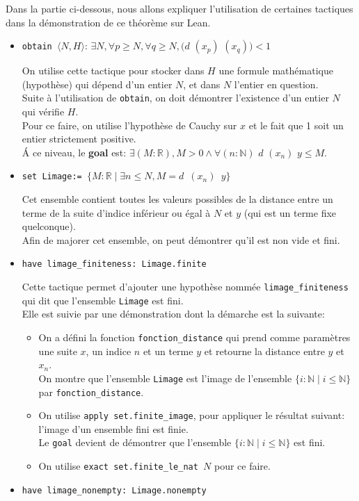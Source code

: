 Dans la partie ci-dessous, nous allons expliquer l'utilisation de certaines tactiques dans la démonstration de ce théorème sur Lean.\\
\begin{itemize}
    \item \texttt{obtain $\langle N, H \rangle $}: $\exists N, \forall p \geq N, \forall q \geq N, (d$ $(x_p)$ $(x_q)) < 1$
    
    On utilise cette tactique pour stocker dans $H$ une formule mathématique (hypothèse) qui dépend d'un entier $N$, et dans $N$ l'entier en question. \\ Suite à l'utilisation de \texttt{obtain}, on doit démontrer l'existence d'un entier $N$ qui vérifie $H$.\\ Pour ce faire, on utilise l'hypothèse de Cauchy sur $x$ et le fait que 1 soit un entier strictement positive.\\
    \'A ce niveau, le \textbf{goal} est: $\exists (M:\mathbb{R}), M > 0 \wedge \forall (n : \mathbb{N})$ $d$ $(x_n)$ $y \leq M$.
    \item \texttt{set Limage:= $\big\{ M: \mathbb{R} \mid \exists n\leq N, M = d$ $(x_n)$ $y\big\}$}
    
    
    Cet ensemble contient toutes les valeurs possibles de la distance entre un terme de la suite d'indice inférieur ou égal à $N$ et $y$ (qui est un terme fixe quelconque).\\ Afin de majorer cet ensemble, on peut démontrer qu'il est non vide et fini.
    \item \texttt{have limage\_finiteness: Limage.finite}
    
    
     Cette tactique permet d'ajouter une hypothèse nommée \texttt{limage\_finiteness} qui dit que l'ensemble \texttt{Limage} est fini.\\ Elle est suivie par une démonstration dont la démarche est la suivante:
    \begin{itemize}
         \item On a défini la fonction \texttt{fonction\_distance} qui prend comme paramètres une suite $x$, un indice $n$ et un terme $y$ et retourne la distance entre $y$ et $x_n$. \\ On montre que l'ensemble \texttt{Limage} est l'image de l'ensemble $\big\{i:\mathbb{N}\mid i\leq \mathbb{N}\big\}$ par \texttt{fonction\_distance}.
        \item On utilise \texttt{apply set.finite\_image}, pour appliquer le résultat suivant: l'image d'un ensemble fini est finie. \\ Le \texttt{goal} devient de démontrer que l'ensemble $\big\{i:\mathbb{N}\mid i\leq \mathbb{N}\big\}$ est fini.
        \item On utilise \texttt{exact set.finite\_le\_nat $N$} pour ce faire.
    \end{itemize}
    \item \texttt{have limage\_nonempty: Limage.nonempty} 
    

\end{itemize}
